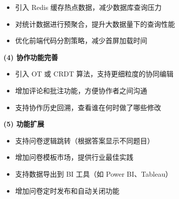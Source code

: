 \begin{itemize}
  \item 引入 Redis 缓存热点数据，减少数据库查询压力
  \item 对统计数据进行预聚合，提升大数据量下的查询性能
  \item 优化前端代码分割策略，减少首屏加载时间
\end{itemize}

\textbf{(4) 协作功能完善}

\begin{itemize}
  \item 引入 OT 或 CRDT 算法，支持更细粒度的协同编辑
  \item 增加评论和批注功能，方便协作者之间沟通
  \item 支持协作历史回溯，查看谁在何时做了哪些修改
\end{itemize}

\textbf{(5) 功能扩展}

\begin{itemize}
  \item 支持问卷逻辑跳转（根据答案显示不同题目）
  \item 增加问卷模板市场，提供行业最佳实践
  \item 支持数据导出到 BI 工具（如 Power BI、Tableau）
  \item 增加问卷定时发布和自动关闭功能
\end{itemize}
